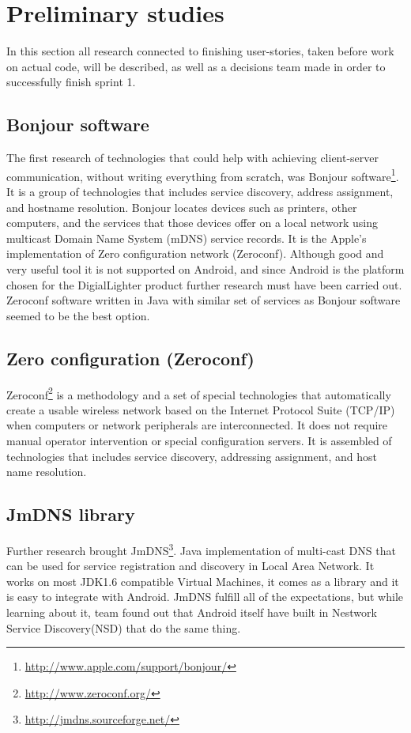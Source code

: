 \section {Preliminary studies}
In this section all research connected to finishing user-stories, taken before work on actual code, will be described, as well as a decisions team made in order to successfully finish sprint 1.

\subsection{Bonjour software}
The first research of technologies that could help with achieving client-server communication, without writing everything from scratch, was Bonjour software\footnote{\url{http://www.apple.com/support/bonjour/}}. 
It is a group of technologies that includes service discovery, address assignment, and hostname resolution. 
Bonjour locates devices such as printers, other computers, and the services that those devices offer on a local network using multicast Domain Name System (mDNS) service records.
It is the Apple's implementation of Zero configuration network (Zeroconf).
Although good and very useful tool it is not supported on Android, and since Android is the platform chosen for the DigialLighter product further research must have been carried out.
Zeroconf software written in Java with similar set of services as Bonjour software seemed to be the best option.

\subsection {Zero configuration (Zeroconf)}
Zeroconf\footnote{\url{http://www.zeroconf.org/}} is a methodology and a set of special technologies that automatically create a usable wireless network based on the Internet Protocol Suite (TCP/IP) when computers or network peripherals are interconnected. 
It does not require manual operator intervention or special configuration servers.
It is assembled of technologies that includes service discovery, addressing assignment, and host name resolution.


\subsection{JmDNS library}
\label{subsection:jmdns_desc}
Further research brought JmDNS\footnote{\url{http://jmdns.sourceforge.net/}}. 
Java implementation of multi-cast DNS that can be used for service registration and discovery in Local Area Network. 
It works on most JDK1.6 compatible Virtual Machines, it comes as a library and it is easy to integrate with Android. 
JmDNS fulfill all of the expectations, but while learning about it, team found out that Android itself have built in Nestwork Service Discovery(NSD) that do the same thing.

